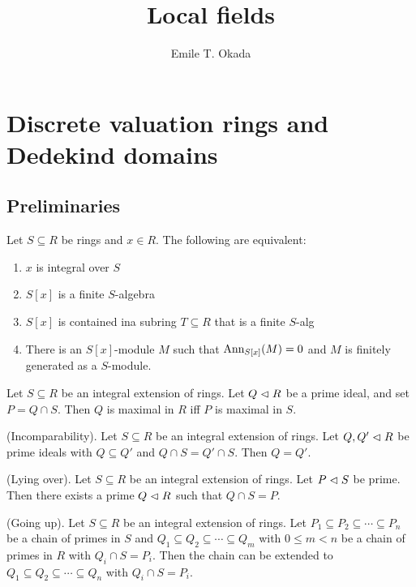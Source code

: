 \documentclass{memoir}
\title{Local fields}
\author{Emile T. Okada}
\begin{document}
\maketitle
\tableofcontents
\chapter{Discrete valuation rings and Dedekind domains}
\section{Preliminaries}
\begin{thm}
    \label{thm:int_dep}
    Let $S\subseteq R$ be rings and $x\in R$.
    The following are equivalent:
    \begin{enumerate}
        \item $x$ is integral over $S$
        \item $S[x]$ is a finite $S$-algebra
        \item $S[x]$ is contained ina subring $T\subseteq R$ that is a finite $S$-alg
        \item There is an $S[x]$-module $M$ such that $\text{Ann}_{S[x]}(M) = 0$ and $M$ is finitely generated as a $S$-module.
    \end{enumerate}
\end{thm}
\begin{lemma}
    Let $S\subseteq R$ be an integral extension of rings. 
    Let $Q\vartriangleleft R$ be a prime ideal, and set $P = Q\cap S$.
    Then $Q$ is maximal in $R$ iff $P$ is maximal in $S$.
\end{lemma}
\begin{lemma}
    (Incomparability).
    Let $S\subseteq R$ be an integral extension of rings.
    Let $Q,Q'\vartriangleleft R$ be prime ideals with $Q\subseteq Q'$ and $Q\cap S = Q'\cap S$. 
    Then $Q = Q'$.
\end{lemma}
\begin{lemma}
    (Lying over).
    Let $S\subseteq R$ be an integral extension of rings.
    Let $P\vartriangleleft S$ be prime.
    Then there exists a prime $Q\vartriangleleft R$ such that $Q\cap S = P$.
\end{lemma}
\begin{thm}
    \label{thm:going_up}
    (Going up).
    Let $S\subseteq R$ be an integral extension of rings.
    Let $P_1\subseteq P_2\subseteq \cdots \subseteq P_n$ be a chain of primes in $S$ and $Q_1\subseteq Q_2\subseteq \cdots \subseteq Q_m$ with $0\le m < n$ be a chain of primes in $R$ with $Q_i\cap S = P_i$.
    Then the chain can be extended to $Q_1\subseteq Q_2\subseteq \cdots \subseteq Q_n$ with $Q_i\cap S = P_i$.
\end{thm}
\end{document}
